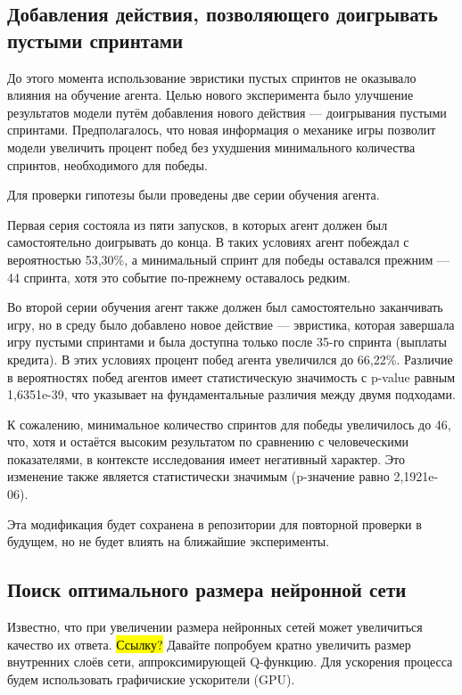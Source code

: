 \documentclass{article}
\begin{document}
\subsection{Добавления действия, позволяющего доигрывать пустыми спринтами}

До этого момента использование эвристики пустых спринтов не оказывало влияния на обучение агента.
Целью нового эксперимента было улучшение результатов модели путём добавления нового действия — доигрывания пустыми спринтами.
Предполагалось, что новая информация о механике игры позволит модели увеличить процент побед без ухудшения минимального количества спринтов, необходимого для победы.

Для проверки гипотезы были проведены две серии обучения агента.

Первая серия состояла из пяти запусков, в которых агент должен был самостоятельно доигрывать до конца.
В таких условиях агент побеждал с вероятностью 53,30\%, а минимальный спринт для победы оставался прежним — 44 спринта, хотя это событие по-прежнему оставалось редким.

Во второй серии обучения агент также должен был самостоятельно заканчивать игру, но в среду было добавлено новое действие — эвристика, которая завершала игру пустыми спринтами и была доступна только после 35-го спринта (выплаты кредита).
В этих условиях процент побед агента увеличился до 66,22\%.
Различие в вероятностях побед агентов имеет статистическую значимость с p-value равным 1,6351e-39, что указывает на фундаментальные различия между двумя подходами.

К сожалению, минимальное количество спринтов для победы увеличилось до 46, что, хотя и остаётся высоким результатом по сравнению с человеческими показателями, в контексте исследования имеет негативный характер.
Это изменение также является статистически значимым (p-значение равно 2,1921e-06).

Эта модификация будет сохранена в репозитории для повторной проверки в будущем, но не будет влиять на ближайшие эксперименты.

\subsection{Поиск оптимального размера нейронной сети}

Известно, что при увеличении размера нейронных сетей может увеличиться качество их ответа.
\hl{Ссылку?}
Давайте попробуем кратно увеличить размер внутренних слоёв сети, аппроксимирующей Q-функцию.
Для ускорения процесса будем использовать графичиские ускорители (GPU).
\end{document}
